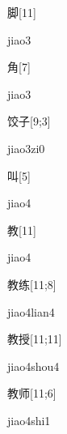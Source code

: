 \begin{verbete}[jiao3]{脚}[11]
\begin{pronuncia}{jiao3}
\end{pronuncia}
\end{verbete}

\begin{verbete}[jiao3]{角}[7]
\begin{pronuncia}{jiao3}
\end{pronuncia}
\end{verbete}

\begin{verbete}[jiao3zi0]{饺子}[9;3]
\begin{pronuncia}{jiao3zi0}
\end{pronuncia}
\end{verbete}

\begin{verbete}[jiao4]{叫}[5]
\begin{pronuncia}{jiao4}
\end{pronuncia}
\end{verbete}

\begin{verbete}[jiao4]{教}[11]
\begin{pronuncia}{jiao4}
\end{pronuncia}
\end{verbete}

\begin{verbete}{教练}[11;8]
\begin{pronuncia}{jiao4lian4}
\end{pronuncia}
\end{verbete}

\begin{verbete}{教授}[11;11]
\begin{pronuncia}{jiao4shou4}
\end{pronuncia}
\end{verbete}

\begin{verbete}{教师}[11;6]
\begin{pronuncia}{jiao4shi1}
\end{pronuncia}
\end{verbete}

